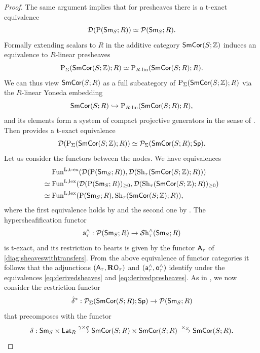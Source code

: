 \documentclass[reqno]{amsart}
\numberwithin{equation}{section}\theoremstyle{thms}
\theoremstyle{defn}
\newcommand{\nP}{\tn{P}}
\newcommand{\bZ}{\mathbb{Z}}
\newcommand{\cD}{\mathcal{D}}
\newcommand{\cP}{\mathcal{P}}
\newcommand{\tn}[1]{\textnormal{#1}}
\newcommand{\tsf}[1]{\textsf{\textup{#1}}}
\newcommand{\tbf}[1]{\textbf{\textup{#1}}}
\newcommand{\mcal}[1]{\mathcal{#1}}
\newcommand{\fun}{\tn{Fun}}
\newcommand{\psigma}{\cP_{\Sigma}}
\newcommand{\sheaves}{\mcal{S}\tn{h}}
\newcommand{\spec}{\tsf{Sp}}
\newcommand{\sms}{\tsf{Sm}_S}
\newcommand{\corsms}[1]{\tsf{SmCor}(S;#1)}
\newcommand{\lat}{\tsf{Lat}}
\begin{document}
\begin{proof}
The same argument implies that for presheaves there is a t-exact equivalence
\begin{equation}\label{eq:derivedpresheaves}
\cD(\nP(\sms;R)) \simeq \cP(\sms;R).
\end{equation}
Formally extending scalars to $R$ in the additive category $\corsms{\bZ}$ induces an equivalence to $R$-linear presheaves
$$\nP_{\Sigma}(\corsms{\bZ};R) \simeq \nP_{R\tn{-lin}}(\corsms{R};R).$$
We can thus view $\corsms{R}$ as a full subcategory of $\nP_{\Sigma}(\corsms{\bZ};R)$ via the $R$-linear Yoneda embedding 
$$\corsms{R} \hookrightarrow \nP_{R\tn{-lin}}(\corsms{R};R),$$ and its elements form a system of compact projective generators in the sense of \cite[Definition 2.51]{pst23}. Then \cite[Lemma 2.61]{pst23} provides a t-exact equivalence
\begin{equation}\label{eq:derivedsheavespresheavestransfers}
\cD(\nP_{\Sigma}(\corsms{\bZ};R)) \simeq \psigma(\corsms{R};\spec).
\end{equation}
Let us consider the functors between the nodes. We have equivalences
\begin{align*}
&\fun^{\tn{L,t-ex}}(\cD(\nP(\sms;R)),\cD(\tn{Sh}_{\tau}(\corsms{\bZ};R))) \\
\simeq \; &\fun^{\tn{L,lex}}(\cD(\nP(\sms;R))_{\geq 0},\cD(\tn{Sh}_{\tau}(\corsms{\bZ};R))_{\geq 0}) \\
\simeq \; &\fun^{\tn{L,lex}}(\nP(\sms;R),\tn{Sh}_{\tau}(\corsms{\bZ};R)),
\end{align*}
where the first equivalence holds by \cite[Proposition C.3.1.1, C.3.2.1]{lur18} and the second one by \cite[Theorem C.5.4.9]{lur18}.
The hypersheafification functor 
$$\tsf{a}^{\wedge}_{\tau}: \cP(\sms;R) \to \sheaves_{\tau}^{\wedge}(\sms;R)$$ is t-exact, and its restriction to hearts is given by the functor $\tsf{A}_{\tau}$ of \ref{diag:sheaveswithtransfers}. From the above equivalence of functor categories it follows that the adjunctions $(\tsf{A}_{\tau},\tbf{R}\tsf{O}_{\tau})$ and $(\tsf{a}^{\wedge}_{\tau},\tsf{o}_{\tau}^{\wedge})$ identify under the equivalences \ref{eq:derivedsheaves} and \ref{eq:derivedpresheaves}. As in , we now consider the restriction functor
$$\hat{\delta}^*: \psigma(\corsms{R};\spec) \to \cP(\sms;R)$$
that precomposes with the functor
$$\delta: \sms \times \lat_R \stackrel{\gamma \times \sigma}{\longrightarrow} \corsms{R} \times \corsms{R} \stackrel{\times_S}{\longrightarrow} \corsms{R}.$$

\end{proof}
\end{document}
